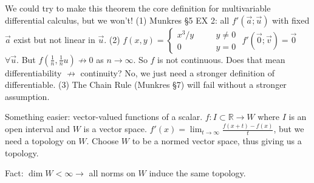 \documentclass[10pt,letterpaper]{article}
\newcommand{\n}{\hfill\break}
\newcommand{\reals}{\mathbb{R}}
\newcommand{\R}{\reals}
\begin{document}
\par\noindent We could try to make this theorem the core definition for multivariable differential calculus, but we won't!\n
(1) Munkres \S{}5 EX 2: all $f'(\vec{a};\vec{u})$ with fixed $\vec{a}$ exist but not linear in $\vec{u}$.\n
(2) $f(x,y)=\left\{\begin{array}{lll}x^{3}/y & \quad & y\ne{}0\\ 0 & \quad & y=0\end{array}\right.$ $f'(\vec{0};\vec{v})=\vec{0}$ $\forall\vec{u}$. But $f(\frac{1}{n},\frac{1}{n}u)\not\to{}0$ as $n\to\infty$. So $f$ is not continuous. Does that mean differentiability $\not\to$ continuity? No, we just need a stronger definition of differentiable.\n
(3) The Chain Rule (Munkres \S{}7) will fail without a stronger assumption.\n

\par\noindent Something easier: vector-valued functions of a scalar.\n
$f:I\subset\R\to{}W$ where $I$ is an open interval and $W$ is a vector space.\n
$f'(x)=\lim_{t\to\infty}\frac{f(x+t)-f(x)}{t}$, but we need a topology on $W$.\n
Choose $W$ to be a normed vector space, thus giving us a topology.\n

\par\noindent Fact: $\dim{}W<\infty\to$ all norms on $W$ induce the same topology.
\end{document}
